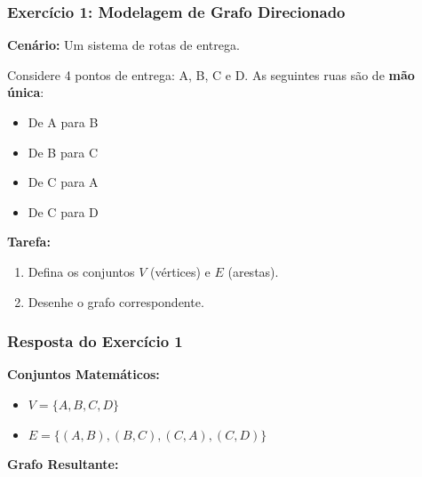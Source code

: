 \documentclass[9pt]{beamer}
\begin{document}
\begin{frame}
    \frametitle{Exercício 1: Modelagem de Grafo Direcionado}
    \textbf{Cenário:} Um sistema de rotas de entrega.
    \vspace{0.3cm}
    
    Considere 4 pontos de entrega: A, B, C e D.
    As seguintes ruas são de \textbf{mão única}:
    \begin{itemize}
        \item De A para B
        \item De B para C
        \item De C para A
        \item De C para D
    \end{itemize}
    \vspace{0.5cm}
    \textbf{Tarefa:} 
    \begin{enumerate}
        \item Defina os conjuntos $V$ (vértices) e $E$ (arestas).
        \item Desenhe o grafo correspondente.
    \end{enumerate}
\end{frame}

\begin{frame}
    \frametitle{Resposta do Exercício 1}
    \textbf{Conjuntos Matemáticos:}
    \begin{itemize}
        \item $V = \{A, B, C, D\}$
        \item $E = \{(A,B), (B,C), (C,A), (C,D)\}$
    \end{itemize}
    \vspace{0.5cm}
    \begin{center}
        \textbf{Grafo Resultante:}\\
        \vspace{0.2cm}
    \end{center}
\end{frame}
\end{document}
